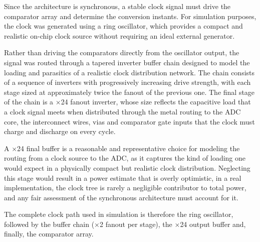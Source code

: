 Since the architecture is synchronous, a stable clock signal must drive the comparator array and determine the conversion instants. For simulation purposes, the clock was generated using a ring oscillator, which provides a compact and realistic on-chip clock source without requiring an ideal external generator.

Rather than driving the comparators directly from the oscillator output, the signal was routed through a tapered inverter buffer chain designed to model the loading and parasitics of a realistic clock distribution network. The chain consists of a sequence of inverters with progressively increasing drive strength, with each stage sized at approximately twice the fanout of the previous one. The final stage of the chain is a $\times$24 fanout inverter, whose size reflects the capacitive load that a clock signal meets when distributed through the metal routing to the ADC core, the interconnect wires, vias and comparator gate inputs that the clock must charge and discharge on every cycle.

A $\times$24 final buffer is a reasonable and representative choice for modeling the routing from a clock source to the ADC, as it captures the kind of loading one would expect in a physically compact but realistic clock distribution. Neglecting this stage would result in a power estimate that is overly optimistic, in a real implementation, the clock tree is rarely a negligible contributor to total power, and any fair assessment of the synchronous architecture must account for it.

The complete clock path used in simulation is therefore the ring oscillator, followed by the buffer chain ($\times$2 fanout per stage), the $\times$24 output buffer and, finally, the comparator array.

